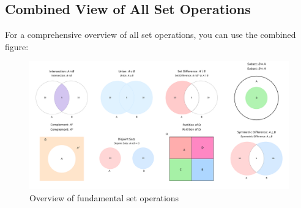 \subsection{Combined View of All Set Operations}

For a comprehensive overview of all set operations, you can use the combined figure:

\begin{figure}[h]
    \centering
    \includegraphics[width=\textwidth]{figures/set_operations/all_operations.png}
    \caption{Overview of fundamental set operations}
    \label{fig:all-set-operations}
\end{figure}


